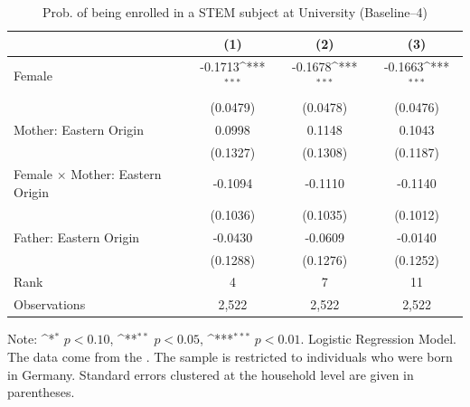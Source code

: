 \documentclass[a4paper, oneside, hyperfootnotes = false]{article}
\def\sym#1{\ifmmode^{#1}\else\(^{#1}\)\fi}
\begin{document}
{\begin{table}[ht]
	\caption[STEM subject at University (Baseline--4)]{Prob. of being enrolled in a STEM subject at University (Baseline--4)}
	\label{tab:baseline--4}
	\begin{center}
		\begin{tabular}{l*{3}{c}}
			\toprule
			&\multicolumn{1}{c}{(1)}         &\multicolumn{1}{c}{(2)}         &\multicolumn{1}{c}{(3)}         \\
			\midrule
			Female              &     -0.1713\sym{***}&     -0.1678\sym{***}&     -0.1663\sym{***}\\
			&    (0.0479)         &    (0.0478)         &    (0.0476)         \\
			\addlinespace
			Mother: Eastern Origin&      0.0998         &      0.1148         &      0.1043         \\
			&    (0.1327)         &    (0.1308)         &    (0.1187)         \\
			\addlinespace
			Female $\times$ Mother: Eastern Origin&     -0.1094         &     -0.1110         &     -0.1140         \\
			&    (0.1036)         &    (0.1035)         &    (0.1012)         \\
			\addlinespace
			Father: Eastern Origin&     -0.0430         &     -0.0609         &     -0.0140         \\
			&    (0.1288)         &    (0.1276)         &    (0.1252)         \\
			\midrule
			Rank                &      4         &     7         &     11         \\
			Observations                   &   2,522         &   2,522         &   2,522         \\
			\bottomrule
		\end{tabular}
		
		\vspace{2mm}
		
		\parbox{10cm}{
			\linespread{1}\footnotesize Note: \sym{*} \(p<0.10\), \sym{**} \(p<0.05\), \sym{***} \(p<0.01\). Logistic Regression Model. The data come from the \cite{SOEP2023}. The sample is restricted to individuals who were born in Germany. Standard errors clustered at the household level are given in parentheses.}
		
	\end{center}
\end{table}

}
\end{document}
